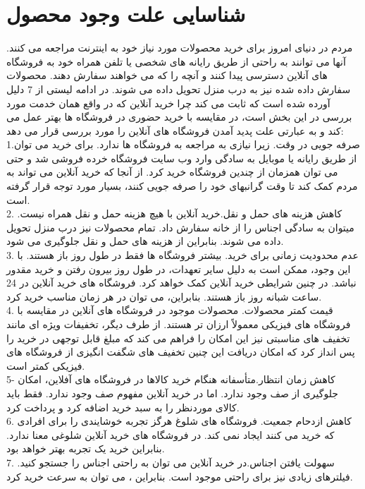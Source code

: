 \documentclass[12pt]{report}
\begin{document}
\section{شناسایی علت وجود محصول}
مردم در دنیای امروز برای خرید محصولات مورد نیاز خود به اینترنت مراجعه می کنند. آنها می توانند به راحتی از طریق رایانه های شخصی یا تلفن همراه خود به فروشگاه های آنلاین دسترسی پیدا کنند و آنچه را که می خواهند سفارش دهند. محصولات سفارش داده شده نیز به درب منزل تحویل داده می شوند. در ادامه لیستی از 7 دلیل آورده شده است که ثابت می کند چرا خرید آنلاین که در واقع همان خدمت مورد بررسی در این بخش است، در مقایسه با خرید حضوری در فروشگاه ها بهتر عمل می کند و به عبارتی علت پدید آمدن فروشگاه های آنلاین را مورد بررسی قرار می دهد:\\
1.صرفه جویی در وقت. زیرا نیازی به مراجعه به فروشگاه ها ندارد. برای خرید می توان از طریق رایانه یا موبایل به سادگی وارد وب سایت فروشگاه خرده فروشی شد و حتی می توان همزمان از چندین فروشگاه خرید کرد. از آنجا که خرید آنلاین می تواند به مردم کمک کند تا وقت گرانبهای خود را صرفه جویی کنند، بسیار مورد توجه قرار گرفته است.\\
2. کاهش هزینه های حمل و نقل.خرید آنلاین با هیچ هزینه حمل و نقل همراه نیست. میتوان به سادگی اجناس را از خانه سفارش داد. تمام محصولات نیز درب منزل تحویل داده می شوند. بنابراین از هزینه های حمل و نقل جلوگیری می شود.\\
3. عدم محدودیت زمانی برای خرید. بیشتر فروشگاه ها فقط در طول روز باز هستند. با این وجود، ممکن است به دلیل سایر تعهدات، در طول روز بیرون رفتن و خرید مقدور نباشد. در چنین شرایطی خرید آنلاین کمک خواهد کرد. فروشگاه های خرید آنلاین در 24 ساعت شبانه روز باز هستند. بنابراین، می توان در هر زمان مناسب خرید کرد.\\
4. قیمت کمتر محصولات. محصولات موجود در فروشگاه های آنلاین در مقایسه با فروشگاه های فیزیکی معمولاً ارزان تر هستند. از طرف دیگر، تخفیفات ویژه ای مانند تخفیف های مناسبتی نیز این امکان را فراهم می کند که مبلغ قابل توجهی در خرید را پس انداز کرد که امکان دریافت این چنین تخفیف های شگفت انگیزی از فروشگاه های فیزیکی کمتر است.\\
5- کاهش زمان انتظار.متأسفانه هنگام خرید کالاها در فروشگاه های آفلاین، امکان جلوگیری از صف وجود ندارد. اما در خرید آنلاین مفهوم صف وجود ندارد. فقط باید کالای موردنظر را به سبد خرید اضافه کرد و پرداخت کرد.\\
6. کاهش ازدحام جمعیت. فروشگاه های شلوغ هرگز تجربه خوشایندی را برای افرادی که خرید می کنند ایجاد نمی کند. در فروشگاه های خرید آنلاین شلوغی معنا ندارد. بنابراین خرید یک تجربه بهتر خواهد بود.\\
7. سهولت یافتن اجناس.در خرید آنلاین می توان به راحتی اجناس را جستجو کنید. فیلترهای زیادی نیز برای راحتی موجود است. بنابراین ، می توان به سرعت خرید کرد.
\end{document}
